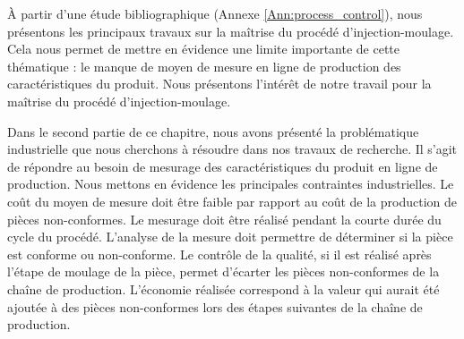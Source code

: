 

À partir d'une étude bibliographique (Annexe \ref{Ann:process_control}), nous présentons les principaux travaux sur la maîtrise du procédé d'injection-moulage.
Cela nous permet de mettre en évidence une limite importante de cette thématique : le manque de moyen de mesure en ligne de production des caractéristiques du produit.
Nous présentons l'intérêt de notre travail pour la maîtrise du procédé d'injection-moulage.

\smallskip

Dans le second partie de ce chapitre, nous avons présenté la problématique industrielle que nous cherchons à résoudre dans nos travaux de recherche.
Il s'agit de répondre au besoin de mesurage des caractéristiques du produit en ligne de production.
Nous mettons en évidence les principales contraintes industrielles.
Le coût du moyen de mesure doit être faible par rapport au coût de la production de pièces non-conformes.
Le mesurage doit être réalisé pendant la courte durée du cycle du procédé.
L'analyse de la mesure doit permettre de déterminer si la pièce est conforme ou non-conforme.
Le contrôle de la qualité, si il est réalisé après l'étape de moulage de la pièce, permet d'écarter les pièces non-conformes de la chaîne de production.
L'économie réalisée correspond à la valeur qui aurait été ajoutée à des pièces non-conformes lors des étapes suivantes de la chaîne de production.

